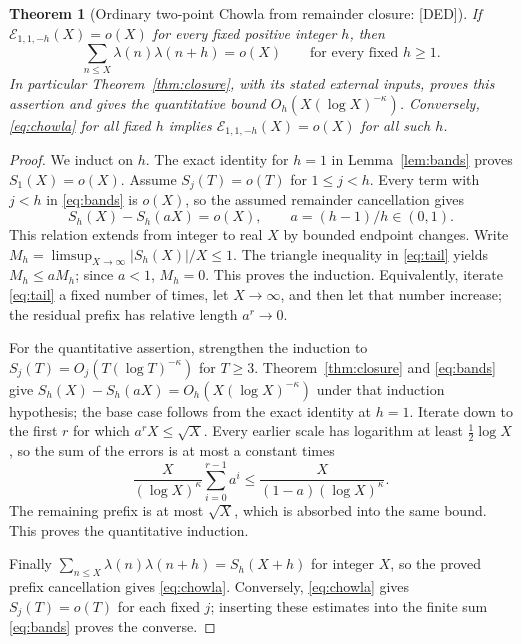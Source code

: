 \documentclass[11pt,a4paper]{article}
\numberwithin{equation}{section}
\newtheorem{theorem}{Theorem}[section]
\theoremstyle{remark}\newtheorem{remark}[theorem]{Remark}
\newcommand{\1}{\mathbf 1}
\begin{document}
\begin{theorem}[Ordinary two-point Chowla from remainder closure: {\rm[DED]}]
\label{thm:chowla}
If $\mathcal E_{1,1,-h}(X)=o(X)$ for every fixed positive integer $h$,
then
\begin{equation}\label{eq:chowla}
 \sum_{n\le X}\lambda(n)\lambda(n+h)=o(X)
 \qquad\text{for every fixed }h\ge1.
\end{equation}
In particular Theorem~\ref{thm:closure}, with its stated external
inputs, proves this assertion and gives the quantitative bound
$O_h(X(\log X)^{-\kappa})$. Conversely, \eqref{eq:chowla} for all
fixed $h$ implies $\mathcal E_{1,1,-h}(X)=o(X)$ for all such $h$.
\end{theorem}
\begin{proof}
We induct on $h$. The exact identity for $h=1$ in
Lemma~\ref{lem:bands} proves $S_1(X)=o(X)$.
Assume $S_j(T)=o(T)$ for $1\le j<h$. Every term with $j<h$ in
\eqref{eq:bands} is $o(X)$, so the assumed remainder cancellation gives
\begin{equation}\label{eq:tail}
 S_h(X)-S_h(aX)=o(X),\qquad a=(h-1)/h\in(0,1).
\end{equation}
This relation extends from integer to real $X$ by bounded endpoint
changes. Write $M_h=\limsup_{X\to\infty}|S_h(X)|/X\le1$.
The triangle inequality in \eqref{eq:tail} yields $M_h\le aM_h$;
since $a<1$, $M_h=0$. This proves the induction.
Equivalently, iterate \eqref{eq:tail} a fixed number of times, let
$X\to\infty$, and then let that number increase; the residual
prefix has relative length $a^r\to0$.

For the quantitative assertion, strengthen the induction to
$S_j(T)=O_j(T(\log T)^{-\kappa})$ for $T\ge3$.
Theorem~\ref{thm:closure} and \eqref{eq:bands} give
$S_h(X)-S_h(aX)=O_h(X(\log X)^{-\kappa})$ under that induction
hypothesis; the base case follows from the exact identity at $h=1$.
Iterate down to the first $r$ for which $a^rX\le\sqrt X$.
Every earlier scale has logarithm at least $\tfrac12\log X$, so the
sum of the errors is at most a constant times
\[
 \frac{X}{(\log X)^\kappa}\sum_{i=0}^{r-1}a^i
 \le \frac{X}{(1-a)(\log X)^\kappa}.
\]
The remaining prefix is at most $\sqrt X$, which is absorbed into
the same bound. This proves the quantitative induction.

Finally
$\sum_{n\le X}\lambda(n)\lambda(n+h)=S_h(X+h)$ for integer $X$,
so the proved prefix cancellation gives \eqref{eq:chowla}.
Conversely, \eqref{eq:chowla} gives $S_j(T)=o(T)$ for each fixed $j$;
inserting these estimates into the finite sum \eqref{eq:bands} proves
the converse.
\end{proof}
\end{document}

